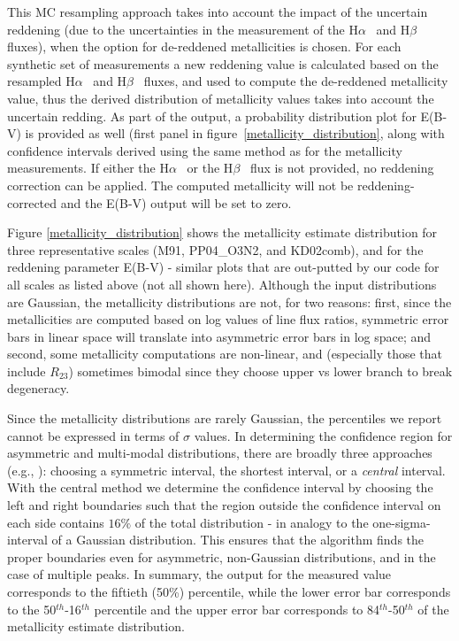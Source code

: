 \documentclass{emulateapj}
\newcommand{\ha}{H$\alpha$}
\newcommand{\hb}{H$\beta$}
\begin{document}
This MC resampling approach takes into account the impact of the uncertain reddening (due to the uncertainties in the measurement of the 
\ha~ and \hb~ fluxes), when the option for de-reddened metallicities is chosen. For each synthetic set of measurements a new reddening value is calculated based on the resampled \ha~ and \hb~ fluxes, and used to compute the de-reddened metallicity value, thus the derived distribution of metallicity values takes into account the uncertain redding. As part of the output, a probability distribution plot for E(B-V) is provided as well (first panel in figure~\ref{metallicity_distribution}, along with confidence intervals derived using the same method as for the metallicity measurements. If either the \ha~ or the \hb~ flux is not provided, no reddening correction can be applied. The computed metallicity will not be  reddening-corrected and the E(B-V) output will be set to zero.

Figure \ref{metallicity_distribution} shows the metallicity estimate distribution for three representative scales (M91, PP04\_O3N2, and KD02comb), and for the reddening parameter E(B-V) - similar plots that are out-putted by our code for all scales as listed above (not all shown here). Although the input distributions are Gaussian, the metallicity distributions 
are not, for two reasons: first, since the metallicities are computed based on log values of line flux ratios, symmetric error bars in linear space will translate into asymmetric error bars in log space; and second, some metallicity computations are non-linear, and (especially those that include $R_{23}$) sometimes bimodal since they choose upper vs lower branch to break degeneracy.

Since the metallicity distributions are rarely Gaussian, the percentiles we report cannot be expressed in terms of $\sigma$ values. In determining the confidence region for asymmetric and multi-modal distributions, there are broadly three approaches (e.g., \citealt{andrae10}): choosing a symmetric interval, the shortest interval,  or a \emph{central} interval.  With the central method we determine the  confidence interval by choosing the left and right boundaries such that the region outside the confidence interval on each side contains $16\%$ of the total distribution - in analogy to the one-sigma-interval of a Gaussian distribution. This ensures that the algorithm finds the proper boundaries even for asymmetric, non-Gaussian distributions, and in the case of multiple peaks. In summary, the output for the measured value corresponds to the fiftieth (50\%) percentile, while the lower error bar corresponds to the 50$^{th}$-16$^{th}$ percentile and the upper error bar corresponds to 84$^{th}$-50$^{th}$ of the metallicity estimate distribution. 
\end{document}
